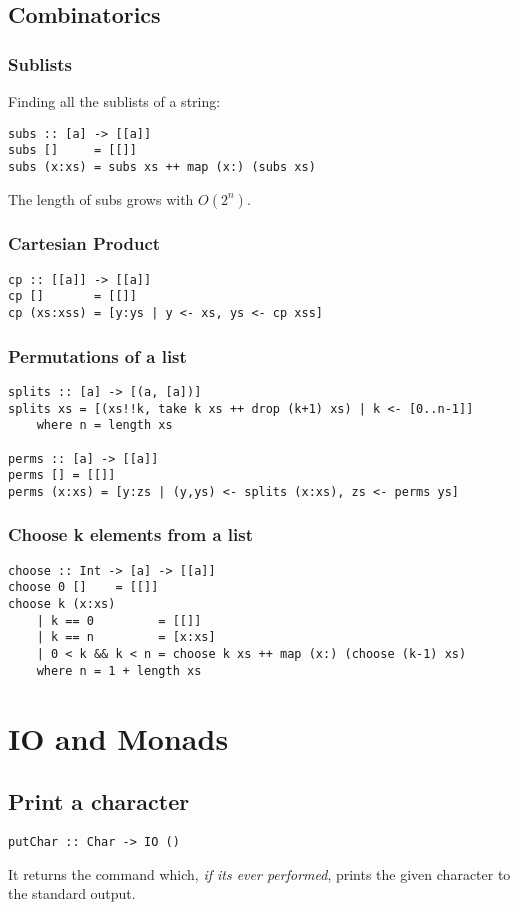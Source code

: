 \documentclass{article}
\begin{document}
\subsection{Combinatorics}
\subsubsection{Sublists}
Finding all the sublists of a string:
\begin{verbatim}
subs :: [a] -> [[a]]
subs []     = [[]]
subs (x:xs) = subs xs ++ map (x:) (subs xs)
\end{verbatim}
The length of subs grows with $O(2^n)$.
\subsubsection{Cartesian Product}
\begin{verbatim}
cp :: [[a]] -> [[a]]
cp []       = [[]]
cp (xs:xss) = [y:ys | y <- xs, ys <- cp xss]
\end{verbatim}
\subsubsection{Permutations of a list}
\begin{verbatim}
splits :: [a] -> [(a, [a])]
splits xs = [(xs!!k, take k xs ++ drop (k+1) xs) | k <- [0..n-1]]
    where n = length xs

perms :: [a] -> [[a]]
perms [] = [[]]
perms (x:xs) = [y:zs | (y,ys) <- splits (x:xs), zs <- perms ys]
\end{verbatim}
\subsubsection{Choose k elements from a list}
\begin{verbatim}
choose :: Int -> [a] -> [[a]]
choose 0 []    = [[]]
choose k (x:xs)
    | k == 0         = [[]]
    | k == n         = [x:xs]
    | 0 < k && k < n = choose k xs ++ map (x:) (choose (k-1) xs)
    where n = 1 + length xs
\end{verbatim}
\section{IO and Monads}
\subsection{Print a character}
\begin{verbatim}
putChar :: Char -> IO ()
\end{verbatim}
It returns the command which, \emph{if its ever performed}, prints the given character to the standard output.
\end{document}
